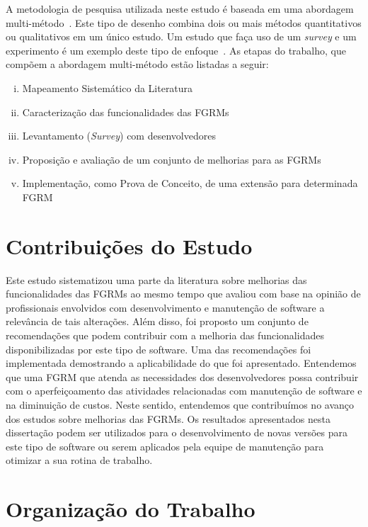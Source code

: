 A metodologia de pesquisa utilizada neste estudo é baseada em uma abordagem
multi-método~\cite{hesse2010mixed}. Este tipo de desenho combina dois ou mais
métodos quantitativos ou qualitativos em um único estudo. Um estudo que faça
uso de um \textit{survey} e um experimento é um exemplo deste tipo de
enfoque~\cite{hesse2010mixed}. As etapas do trabalho, que compõem a abordagem
multi-método estão listadas a seguir:

\begin{enumerate}[(i)]
	\item Mapeamento Sistemático da Literatura~\cite{Petersen2008}
	\item Caracterização das funcionalidades das FGRMs
    \item Levantamento (\textit{Survey}) com
          desenvolvedores~\cite{wohlin2012experimentation}
	\item Proposição e avaliação de um conjunto de melhorias para as FGRMs
    \item Implementação, como Prova de Conceito, de uma extensão para
        determinada FGRM
\end{enumerate}

\section{Contribuições do Estudo}
\label{sec:intro-contribuicao}

Este estudo sistematizou uma parte da literatura sobre melhorias das
funcionalidades das FGRMs ao mesmo tempo que avaliou com base na opinião de
profissionais envolvidos com desenvolvimento e manutenção de software a
relevância de tais alterações. Além disso, foi proposto um conjunto de
recomendações que podem contribuir com a melhoria das funcionalidades
disponibilizadas por este tipo de software. Uma das recomendações foi
implementada demostrando a aplicabilidade do que foi apresentado. Entendemos
que uma FGRM que atenda as necessidades dos desenvolvedores possa contribuir
com o aperfeiçoamento das atividades relacionadas com manutenção de software e
na diminuição de custos. Neste sentido, entendemos que contribuímos no avanço
dos estudos sobre melhorias das FGRMs. Os resultados apresentados nesta
dissertação podem ser utilizados para o desenvolvimento de novas versões para
este tipo de software ou serem aplicados pela equipe de manutenção para
otimizar a sua rotina de trabalho.

\section{Organização do Trabalho}
\label{sec:intro-organizacao-dissertacao}

